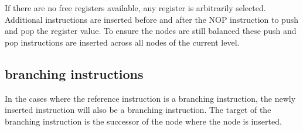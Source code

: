 If there are no free registers available, any register is arbitrarily selected. Additional instructions are inserted before and after the NOP instruction to push and pop the register value. To ensure the nodes are 
still balanced these push and pop instructions are inserted across all nodes of the current level. 

\subsection{branching instructions}
In the cases where the reference instruction is a branching instruction, the newly inserted instruction will also be a branching instruction. The target of the branching instruction is the successor of the node where 
the node is inserted. 


\begin{algorithm*}
  \SetAlgoLined
  \DontPrintSemicolon
  
  
   

\end{algorithm*}
